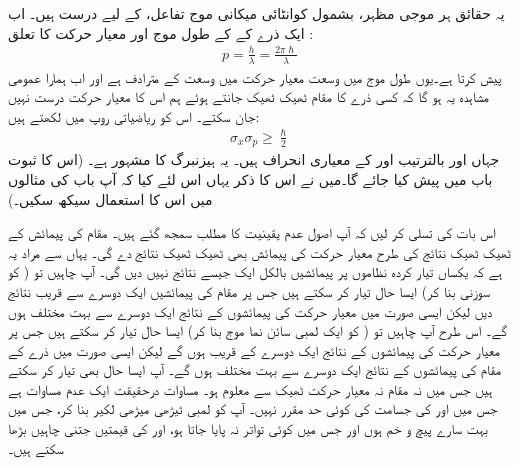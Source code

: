  یہ حقائق ہر موجی مظہر، بشمول کوانٹائی میکانی موج تفاعل، کے لیے درست ہیں۔ اب ایک ذرے کے  کے طول موج اور  معیار حرکت کا تعلق  :
\begin{align}\label{مساوات_تفاعل_موج_ڈی_بروگلی_معیار_حرکت}
p=\frac{h}{\lambda}=\frac{2\pi\hslash}{\lambda}
\end{align}
پیش کرتا ہے۔یوں طول موج میں وسعت  معیار حرکت میں  وسعت  کے مترادف  ہے اور  اب ہمارا عمومی مشاہدہ  یہ  ہو گا کہ کسی ذرے کا مقام ٹھیک ٹھیک جانتے ہوئے ہم اس کا معیار حرکت  درست نہیں   جان سکتے۔ اس کو ریاضیاتی روپ میں لکھتے ہیں:
\begin{align}\label{مساوات_تفاعل_موج_اصول_عدم_یقینیت}
\sigma_{x}\sigma_{p}\ge\frac{\hslash}{2}
\end{align}
جہاں  اور  بالترتیب  اور  کے معیاری انحراف ہیں۔ یہ   ہیزنبرگ کا مشہور   ہے۔ (اس کا ثبوت  باب  میں پیش کیا جائے گا۔میں نے   اس کا ذکر یہاں اس لئے  کیا  کہ  آپ باب  کی مثالوں میں اس کا  استعمال  سیکھ سکیں۔)

 اس بات کی تسلی کر لیں کہ آپ   اصول عدم یقینیت کا مطلب سمجھ   گئے    ہیں۔  مقام کی پیمائش کے ٹھیک ٹھیک نتائج کی طرح معیار حرکت کی پیمائش بھی ٹھیک ٹھیک نتائج دے گی۔ یہاں    سے مراد یہ ہے کہ یکساں تیار کردہ  نظاموں پر پیمائشیں  بالکل ایک جیسے نتائج  نہیں دیں گی۔  آپ چاہیں تو ( کو سوزنی  بنا کر) ایسا حال تیار کر سکتے ہیں جس پر مقام کی پیمائشیں ایک دوسرے سے  قریب نتائج  دیں لیکن ایسی صورت میں معیار حرکت کی پیمائشوں کے نتائج ایک دوسرے سے بہت مختلف ہوں گے۔ اس طرح آپ چاہیں تو ( کو ایک لمبی سائن نما موج بنا کر) ایسا حال تیار کر سکتے ہیں جس پر معیار حرکت کی پیمائشوں کے نتائج ایک دوسرے کے قریب   ہوں گے لیکن ایسی صورت میں ذرے کے مقام کی پیمائشوں کے نتائج ایک دوسرے سے بہت مختلف ہوں گے۔ آپ ایسا حال بھی تیار کر سکتے ہیں جس میں نہ مقام    نہ   معیار حرکت ٹھیک سے معلوم ہو۔ مساوات  درحقیقت ایک عدم مساوات ہے جس میں  اور  کی جسامت کی  کوئی حد مقرر نہیں۔ آپ  کو   لمبی ٹیڑھی میڑھی   لکیر بنا کر، جس میں بہت سارے  پیچ و خم   ہوں اور جس میں کوئی تواتر نہ پایا جاتا ہو،  اور  کی قیمتیں جتنی چاہیں بڑھا سکتے ہیں۔

